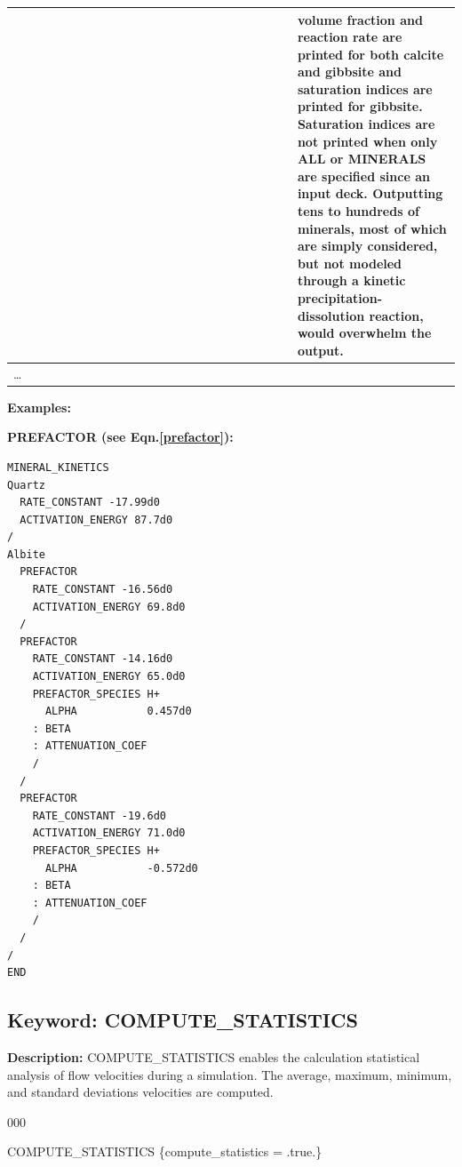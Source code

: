 \documentclass[12pt]{article}
\begin{document}
\begin{center}
\begin{tabularx}{\linewidth}{lX}
~~~~~~~~~~~~~~~~~~~~~~~~~~~~~~~~~~~~~~ & volume fraction and reaction rate are printed for both calcite and gibbsite and saturation indices are printed for gibbsite.  Saturation indices are not printed when only ALL or MINERALS are specified since an input deck. Outputting tens to hundreds of minerals, most of which are simply considered, but not modeled through a kinetic precipitation-dissolution reaction, would overwhelm the output. \\

\midrule
\ldots & \\
\bottomrule
\end{tabularx}
\end{center}

\bigskip

\noindent
{\bf Examples:}

\noindent
{\bf PREFACTOR (see Eqn.\eqref{prefactor}):}
\begin{verbatim}
MINERAL_KINETICS
Quartz 
  RATE_CONSTANT -17.99d0
  ACTIVATION_ENERGY 87.7d0
/
Albite 
  PREFACTOR
    RATE_CONSTANT -16.56d0
    ACTIVATION_ENERGY 69.8d0
  /
  PREFACTOR
    RATE_CONSTANT -14.16d0
    ACTIVATION_ENERGY 65.0d0
    PREFACTOR_SPECIES H+
      ALPHA           0.457d0
    : BETA
    : ATTENUATION_COEF
    /
  /
  PREFACTOR
    RATE_CONSTANT -19.6d0
    ACTIVATION_ENERGY 71.0d0
    PREFACTOR_SPECIES H+
      ALPHA           -0.572d0
    : BETA
    : ATTENUATION_COEF
    /
  /
/
END
\end{verbatim}


\newpage
\protect\hypertarget{target_stat}{}

\subsection{Keyword: COMPUTE\_STATISTICS}

\noindent
{\bf Description:}
COMPUTE\_STATISTICS enables the calculation statistical analysis of flow velocities during a simulation.  The average, maximum, minimum, and standard deviations velocities are computed.

\begin{deflist}{000}
\item [COMPUTE\_STATISTICS] \{compute\_statistics = .true.\}
\end{deflist}
\end{document}
